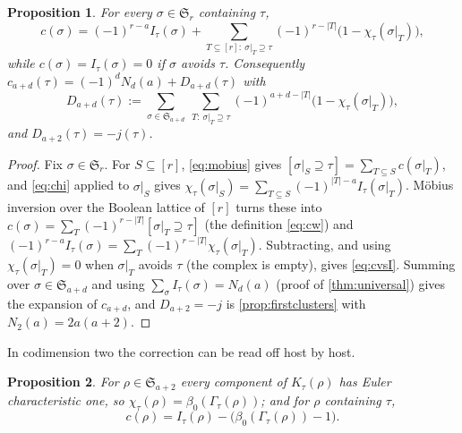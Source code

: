 \documentclass[11pt,reqno]{amsart}
\theoremstyle{plain}
\newtheorem{proposition}[proposition]{Proposition}
\theoremstyle{definition}
\theoremstyle{remark}
\newcommand{\bb}[1]{\left[#1\right]}
\newcommand{\Sym}{\mathfrak{S}}
\newcommand{\Gam}{\Gamma}
\newcommand{\bz}{\beta_0}
\begin{document}
\begin{proposition}\label{prop:weights}
For every $\sigma\in\Sym_r$ containing $\tau$,
\begin{equation}\label{eq:cvsI}
c(\sigma)=(-1)^{r-a}I_\tau(\sigma)+\sum_{T\subseteq[r]:\ \sigma|_T\supseteq\tau}(-1)^{r-|T|}\bigl(1-\chi_\tau(\sigma|_T)\bigr),
\end{equation}
while $c(\sigma)=I_\tau(\sigma)=0$ if $\sigma$ avoids $\tau$. Consequently $c_{a+d}(\tau)=(-1)^dN_d(a)+D_{a+d}(\tau)$ with
\begin{equation}\label{eq:D}
D_{a+d}(\tau):=\sum_{\sigma\in\Sym_{a+d}}\ \sum_{T:\ \sigma|_T\supseteq\tau}(-1)^{a+d-|T|}\bigl(1-\chi_\tau(\sigma|_T)\bigr),
\end{equation}
and $D_{a+2}(\tau)=-j(\tau)$.
\end{proposition}

\begin{proof}
Fix $\sigma\in\Sym_r$. For $S\subseteq[r]$, \eqref{eq:mobius} gives $\bb{\sigma|_S\supseteq\tau}=\sum_{T\subseteq S}c(\sigma|_T)$, and \eqref{eq:chi} applied to $\sigma|_S$ gives $\chi_\tau(\sigma|_S)=\sum_{T\subseteq S}(-1)^{|T|-a}I_\tau(\sigma|_T)$. Möbius inversion over the Boolean lattice of $[r]$ turns these into $c(\sigma)=\sum_T(-1)^{r-|T|}\bb{\sigma|_T\supseteq\tau}$ (the definition \eqref{eq:cw}) and $(-1)^{r-a}I_\tau(\sigma)=\sum_T(-1)^{r-|T|}\chi_\tau(\sigma|_T)$. Subtracting, and using $\chi_\tau(\sigma|_T)=0$ when $\sigma|_T$ avoids $\tau$ (the complex is empty), gives \eqref{eq:cvsI}. Summing over $\sigma\in\Sym_{a+d}$ and using $\sum_\sigma I_\tau(\sigma)=N_d(a)$ (proof of \cref{thm:universal}) gives the expansion of $c_{a+d}$, and $D_{a+2}=-j$ is \cref{prop:firstclusters} with $N_2(a)=2a(a+2)$.
\end{proof}

In codimension two the correction can be read off host by host.

\begin{proposition}\label{prop:chi2}
For $\rho\in\Sym_{a+2}$ every component of $K_\tau(\rho)$ has Euler characteristic one, so $\chi_\tau(\rho)=\bz(\Gam_\tau(\rho))$; and for $\rho$ containing $\tau$,
\begin{equation}\label{eq:c2}
c(\rho)=I_\tau(\rho)-\bigl(\bz(\Gam_\tau(\rho))-1\bigr).
\end{equation}
\end{proposition}
\end{document}
